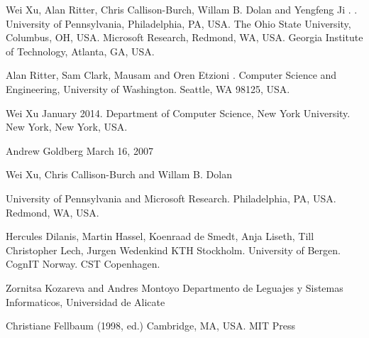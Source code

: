 \documentclass[11pt,letterpaper]{article}
\begin{document}
\begin{thebibliography}{}

Wei Xu, Alan Ritter, Chris Callison-Burch, Willam B. Dolan and Yengfeng Ji
.
.
\newblock University of Pennsylvania, Philadelphia, PA, USA.
\newblock The Ohio State University, Columbus, OH, USA.
\newblock Microsoft Research, Redmond, WA, USA.
\newblock Georgia Institute of Technology, Atlanta, GA, USA.

Alan Ritter, Sam Clark, Mausam and Oren Etzioni
.
\newblock Computer Science and Engineering, University of Washington.
\newblock Seattle, WA 98125, USA.

Wei Xu
\newblock January 2014.
\newblock Department of Computer Science, New York University.
\newblock New York, New York, USA.

Andrew Goldberg
\newblock March 16, 2007

Wei Xu, Chris Callison-Burch and Willam B. Dolan

\newblock University of Pennsylvania and Microsoft Research.
\newblock Philadelphia, PA, USA.
\newblock Redmond, WA, USA.

Hercules Dilanis, Martin Hassel, Koenraad de Smedt, Anja Liseth, Till Christopher Lech, Jurgen Wedenkind
\newblock KTH Stockholm.
\newblock University of Bergen.
\newblock CognIT Norway.
\newblock CST Copenhagen.

Zornitsa Kozareva and Andres Montoyo
\newblock Departmento de Leguajes y Sistemas Informaticos, Universidad de Alicate

Christiane Fellbaum
\newblock (1998, ed.)
\newblock Cambridge, MA, USA.
\newblock MIT Press



\end{thebibliography}
\end{document}
